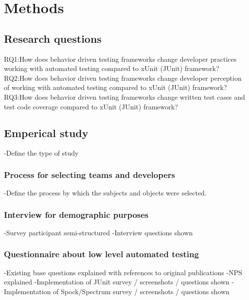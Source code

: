 \chapter{Methods}
\label{chapter:methods}

\section{Research questions}
RQ1:How does behavior driven testing frameworks change developer practices working with automated testing compared to xUnit (JUnit) framework?\newline
RQ2:How does behavior driven testing frameworks change developer perception of working with automated testing compared to xUnit (JUnit) framework?\newline
RQ3:How does behavior driven testing frameworks change written test cases and test code coverage compared to xUnit (JUnit) framework?\newline

\section{Emperical study}
-Define the type of study
\subsection{Process for selecting teams and developers}
-Define the process by which the subjects and objects were selected.\newline
\subsection{Interview for demographic purposes}
-Survey participant semi-structured\newline
-Interview questions shown\newline
\subsection{Questionnaire about low level automated testing}
    -Existing base questions explained with references to original publications\newline
    -NPS explained\newline
    -Implementation of JUnit survey / screenshots / questions shown\newline
    -Implementation of Spock/Spectrum survey / screenshots / questions shown\newline\newline

